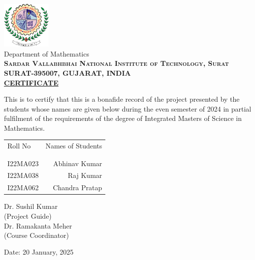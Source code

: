 \newpage
\thispagestyle{empty}

\begin{center}
\includegraphics[width=0.18\textwidth]{./svnit-logo}\\[0.1in]
\huge{Department of Mathematics}\\[0.1cm]
\normalsize
\textbf{\textsc{Sardar Vallabhbhai National Institute of Technology, Surat \\ SURAT-395007, GUJARAT, INDIA}}\\[1.5cm]
	
	
\textbf{\LARGE \underline{CERTIFICATE}}\\[0.5cm]
\end{center}
\normalsize This is to certify that this is a bonafide record of the project presented by the students whose names are given below during the even semester of 2024 in partial fulfilment of the requirements of the degree of Integrated Masters of Science in Mathematics.\\[1.0cm]

\begin{table}[h]
\centering
\begin{tabular}{lr}
Roll No & Names of Students \\ \\ \hline
\\
I22MA023 & Abhinav Kumar \\ 
I22MA038 &  Raj Kumar \\
I22MA062 & Chandra Pratap \\
\end{tabular}
\end{table}

\vfill

\begin{flushright}
Dr. Sushil Kumar\\
(Project Guide)\\[1.5cm]
Dr. Ramakanta Meher\\
(Course Coordinator)\\
\end{flushright}

\begin{flushleft}
Date: 20 January, 2025
\end{flushleft}